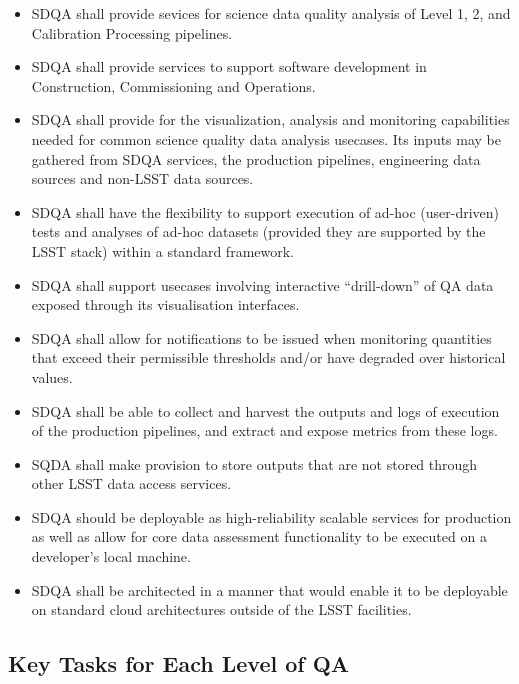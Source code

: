 \begin{itemize}
\item SDQA shall provide sevices for science data quality analysis of Level 1, 2, and Calibration Processing pipelines.

\item SDQA shall provide services to support software development in Construction, Commissioning and Operations.

\item SDQA shall provide for the visualization, analysis and monitoring capabilities needed for common science quality data analysis usecases. Its inputs may be gathered from SDQA services, the production pipelines, engineering data sources and non-LSST data sources.

\item SDQA shall have the flexibility to support execution of ad-hoc (user-driven) tests and analyses of ad-hoc datasets (provided they are supported by the LSST stack) within a standard framework.

\item SDQA shall support usecases involving interactive ``drill-down'' of QA data exposed through its visualisation interfaces.

\item SDQA shall allow for notifications to be issued when monitoring quantities that exceed their permissible thresholds and/or have degraded over historical values.

\item SDQA shall be able to collect and harvest the outputs and logs of execution of the production pipelines, and extract and expose metrics from these logs.

\item SQDA shall make provision to store outputs that are not stored through other LSST data access services.

\item SDQA should be deployable as high-reliability scalable services for production as well as allow for core data assessment functionality to be executed on a developer's local machine.

\item SDQA shall be architected in a manner that would enable it to be deployable on standard cloud architectures outside of the LSST facilities.


\end{itemize}


\subsection{Key Tasks for Each Level of QA}

